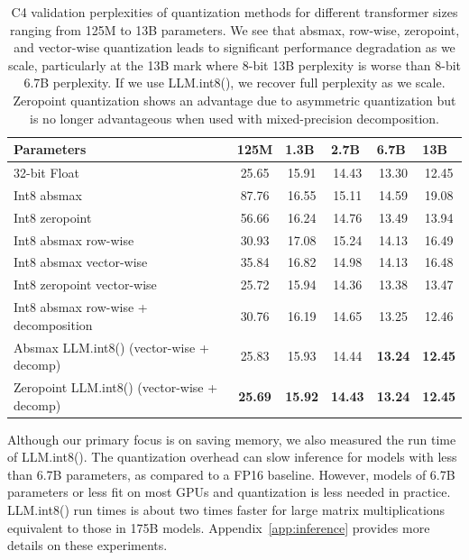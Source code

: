\documentclass{article}
\begin{document}
\begin{table}[]
\centering
\caption{C4 validation perplexities of quantization methods for different transformer sizes ranging from 125M to 13B parameters. We see that absmax, row-wise, zeropoint, and vector-wise quantization leads to significant performance degradation as we scale, particularly at the 13B mark where 8-bit 13B perplexity is worse than 8-bit 6.7B perplexity. If we use LLM.int8(), we recover full perplexity as we scale. Zeropoint quantization shows an advantage due to asymmetric quantization but is no longer advantageous when used with mixed-precision decomposition.}
\label{tbl:inference}
\begin{tabular}{lccccc}\toprule
Parameters &
  \multicolumn{1}{l}{125M} &
  \multicolumn{1}{l}{1.3B} &
  \multicolumn{1}{l}{2.7B} &
  \multicolumn{1}{l}{6.7B} &
  \multicolumn{1}{l}{13B} \\
 \toprule
32-bit Float                 & 25.65 & 15.91 & 14.43 & 13.30  & 12.45 \\\midrule
Int8 absmax                   & 87.76 & 16.55 & 15.11 & 14.59 & 19.08 \\
Int8 zeropoint                & 56.66 & 16.24 & 14.76 & 13.49 & 13.94 \\\midrule
Int8 absmax row-wise                   & 30.93 & 17.08 & 15.24 & 14.13 & 16.49 \\
Int8 absmax vector-wise                   & 35.84 & 16.82 & 14.98 & 14.13 & 16.48 \\
Int8 zeropoint vector-wise         & 25.72 & 15.94 & 14.36 & 13.38 & 13.47 \\\midrule
Int8 absmax row-wise + decomposition                     & 30.76 & 16.19 & 14.65 & 13.25 & 12.46 \\
Absmax LLM.int8() (vector-wise + decomp)          & 25.83 & 15.93 & 14.44 & \bf 13.24 & \bf 12.45 \\
Zeropoint LLM.int8() (vector-wise + decomp)          & \bf 25.69 & \bf 15.92 & \bf 14.43 & \bf 13.24 & \bf 12.45\\\bottomrule
\end{tabular}
\end{table}


Although our primary focus is on saving memory, we also measured the run time of LLM.int8(). The quantization overhead can slow inference for models with less than 6.7B parameters, as compared to a FP16 baseline. However, models of 6.7B parameters or less fit on most GPUs and quantization is less needed in practice. LLM.int8() run times is about two times faster for large matrix multiplications equivalent to those in 175B models. Appendix~\ref{app:inference} provides more details on these experiments. 
\end{document}
